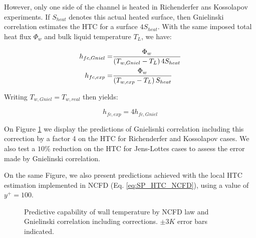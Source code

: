 However, only one side of the channel is heated in Richenderfer ans Kossolapov experiments. If $S_{heat}$ denotes this actual heated surface, then Gnielinski correlation estimates the HTC for a surface $4S_{heat}$. With the same imposed total heat flux $\Phi_{w}$ and bulk liquid temperature $T_{L}$, we have:

\begin{align}
h_{fc,Gniel} =& \frac{\Phi_{w}}{\left( T_{w,Gniel}-T_{L} \right) 4S_{heat}} \\
h_{fc,exp} =& \frac{\Phi_{w}}{\left( T_{w,exp}-T_{L} \right) S_{heat}}
\end{align}

Writing $T_{w,Gniel}=T_{w,real}$ then yields:

\begin{equation}
h_{fc,exp}=4h_{fc,Gniel}
\end{equation}

On Figure \ref{fig:ncfd_gniel_corr_htc} we display the predictions of Gnielisnki correlation including this correction by a factor 4 on the HTC for Richenderfer and Kossolapov cases. We also test a $10\%$ reduction on the HTC for Jens-Lottes cases to assess the error made by Gnielinski correlation.

On the same Figure, we also present predictions achieved with the local HTC estimation implemented in NCFD (Eq. \ref{eq:SP_HTC_NCFD}), using a value of $y^{+}=100$. 


\begin{figure}[h!]
\centering
{} 
\caption{Predictive capability of wall temperature by NCFD law and Gnielinski correlation including corrections. $\pm 3K$ error bars indicated.}
\label{fig:ncfd_gniel_corr_htc}
\end{figure}

